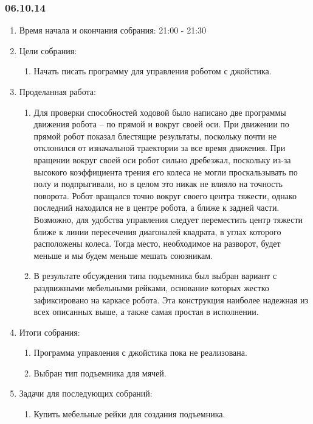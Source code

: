 \textsl{}
\subsubsection{06.10.14}

\begin{enumerate}
	\item Время начала и окончания собрания:
	21:00 - 21:30
	\item Цели собрания:
	\begin{enumerate}
	  \item Начать писать программу для управления роботом с джойстика.
	  
    \end{enumerate}
	\item Проделанная работа:
	\begin{enumerate}
	  \item Для проверки способностей ходовой было написано две программы движения робота – по прямой и вокруг своей оси. При движении по прямой робот показал блестящие результаты, поскольку почти не отклонился от изначальной траектории за все время движения. При вращении вокруг своей оси робот сильно дребезжал, поскольку из-за высокого коэффициента трения его колеса не могли проскальзывать по полу и подпрыгивали, но в целом это никак не влияло на точность поворота. Робот вращался точно вокруг своего центра тяжести, однако последний находился не в центре робота, а ближе к задней части. Возможно, для удобства управления следует переместить центр тяжести ближе к линии пересечения диагоналей квадрата, в углах которого расположены колеса. Тогда место, необходимое на разворот, будет меньше и мы будем меньше мешать союзникам.
      
      \item  В результате обсуждения типа подъемника был выбран вариант с раздвижными мебельными рейками, основание которых жестко зафиксировано на каркасе робота. Эта конструкция наиболее надежная из всех описанных выше, а также самая простая в исполнении.
      
    \end{enumerate}
    
	\item Итоги собрания: 
	\begin{enumerate}
	  \item  Программа управления с джойстика пока не реализована.
	  
      \item  Выбран тип подъемника для мячей.
    \end{enumerate}
    
	\item Задачи для последующих собраний:
	\begin{enumerate}
	  \item Купить мебельные рейки для создания подъемника.

    \end{enumerate}     
\end{enumerate}
\fillpage
